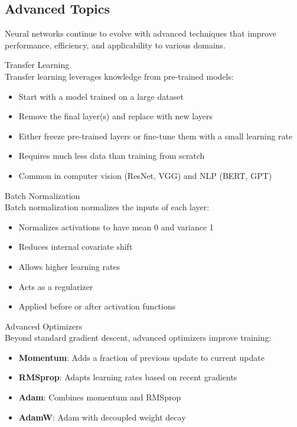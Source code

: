 \multend

\raggedcolumns
\columnbreak

\subsection{Advanced Topics}

Neural networks continue to evolve with advanced techniques that improve performance, efficiency, and applicability to various domains.

\begin{concept}{Transfer Learning}\\
Transfer learning leverages knowledge from pre-trained models:
\begin{itemize}
    \item Start with a model trained on a large dataset
    \item Remove the final layer(s) and replace with new layers
    \item Either freeze pre-trained layers or fine-tune them with a small learning rate
    \item Requires much less data than training from scratch
    \item Common in computer vision (ResNet, VGG) and NLP (BERT, GPT)
\end{itemize}
\end{concept}

\begin{definition}{Batch Normalization}\\
Batch normalization normalizes the inputs of each layer:
\begin{itemize}
    \item Normalizes activations to have mean 0 and variance 1
    \item Reduces internal covariate shift
    \item Allows higher learning rates
    \item Acts as a regularizer
    \item Applied before or after activation functions
\end{itemize}
\end{definition}

\begin{concept}{Advanced Optimizers}\\
Beyond standard gradient descent, advanced optimizers improve training:
\begin{itemize}
    \item \textbf{Momentum}: Adds a fraction of previous update to current update
    \item \textbf{RMSprop}: Adapts learning rates based on recent gradients
    \item \textbf{Adam}: Combines momentum and RMSprop
    \item \textbf{AdamW}: Adam with decoupled weight decay
\end{itemize}
\end{concept}

